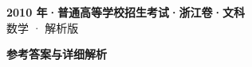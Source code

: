\documentclass[zihao=-4, a4paper]{ctexart}
\begin{document}
\begin{center}
  {\Large\bfseries 2010 年·普通高等学校招生考试·浙江卷·文科}\\[4pt]
  {\large 数学 · 解析版}
\end{center}
\medskip
{}

\clearpage
{}
\begin{center}{\Large\bfseries 参考答案与详细解析}\end{center}
\medskip

\end{document}

